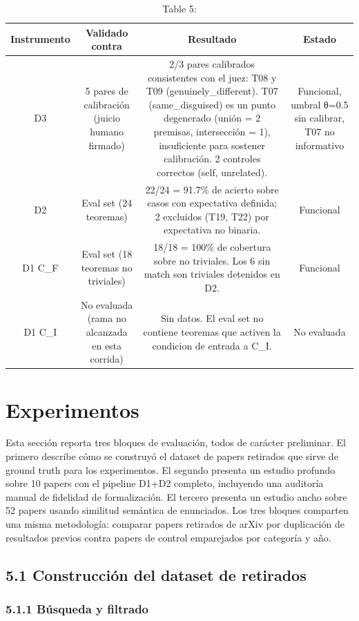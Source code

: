 \documentclass[12pt,a4paper]{article}
\theoremstyle{remark}
\begin{document}
\begin{table}[htbp]
\centering
\begin{tabular}{|c|c|c|c|}
\hline
Instrumento & Validado contra & Resultado & Estado \\
\hline
D3 & 5 pares de calibración (juicio humano firmado) & 2/3 pares calibrados consistentes con el juez: T08 y T09 (genuinely\_different). T07 (same\_disguised) es un punto degenerado (unión = 2 premisas, intersección = 1), insuficiente para sostener calibración. 2 controles correctos (self, unrelated). & Funcional, umbral θ=0.5 sin calibrar, T07 no informativo \\
D2 & Eval set (24 teoremas) & 22/24 = 91.7\% de acierto sobre casos con expectativa definida; 2 excluidos (T19, T22) por expectativa no binaria. & Funcional \\
D1 C\_F & Eval set (18 teoremas no triviales) & 18/18 = 100\% de cobertura sobre no triviales. Los 6 sin match son triviales detenidos en D2. & Funcional \\
D1 C\_I & No evaluada (rama no alcanzada en esta corrida) & Sin datos. El eval set no contiene teoremas que activen la condicion de entrada a C\_I. & No evaluada \\
\hline
\end{tabular}
\caption{Table 5: }
\label{tab:5}
\end{table}


\section{Experimentos}

Esta sección reporta tres bloques de evaluación, todos de carácter preliminar. El primero describe cómo se construyó el dataset de papers retirados que sirve de ground truth para los experimentos. El segundo presenta un estudio profundo sobre 10 papers con el pipeline D1+D2 completo, incluyendo una auditoría manual de fidelidad de formalización. El tercero presenta un estudio ancho sobre 52 papers usando similitud semántica de enunciados. Los tres bloques comparten una misma metodología: comparar papers retirados de arXiv por duplicación de resultados previos contra papers de control emparejados por categoría y año.


\subsection{5.1 Construcción del dataset de retirados}

\subsubsection{5.1.1 Búsqueda y filtrado}
\end{document}
